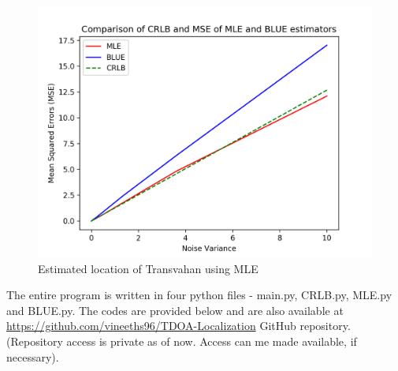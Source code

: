 \documentclass[a4 paper]{article}
\begin{document}
\newpage
{}

\vspace{6em}

\begin{figure}[h]
	\includegraphics[width=\linewidth]{../results/MSE.png}
	\caption{Estimated location of Transvahan using MLE}
	\label{fig:MSE}
\end{figure}





\newpage
{}
\solution The entire program is written in four python files - main.py, CRLB.py, MLE.py and BLUE.py. The codes are provided below and are also available at \url{https://github.com/vineeths96/TDOA-Localization} GitHub repository. (Repository access is private as of now. Access can me made available, if necessary).

\inputminted[frame=lines, framesep=2mm, baselinestretch=1.2, fontsize=\footnotesize, linenos]{python}{../main.py}


\newpage
{}
\inputminted[frame=lines, framesep=2mm, baselinestretch=1.2, fontsize=\footnotesize, linenos]{python}{../CRLB.py}


\newpage
{}
\inputminted[frame=lines, framesep=2mm, baselinestretch=1.2, fontsize=\footnotesize, linenos]{python}{../MLE.py}


\newpage
{}
\inputminted[frame=lines, framesep=2mm, baselinestretch=1.2, fontsize=\footnotesize, linenos]{python}{../BLUE.py}
\end{document}

